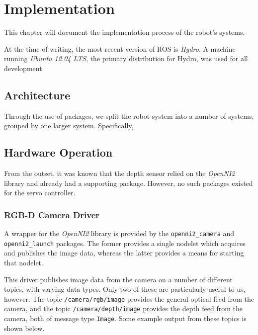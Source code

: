 \chapter{Implementation}


This chapter will document the implementation process of the robot's systems.

At the time of writing, the most recent version of ROS is \emph{Hydro}. A machine running \emph{Ubuntu 12.04 LTS}, the primary distribution for Hydro, was used for all development.


\section{Architecture}

Through the use of packages, we split the robot system into a number of systems, grouped by one larger system. Specifically, 


\section{Hardware Operation}

From the outset, it was known that the depth sensor relied on the \emph{OpenNI2} library and already had a supporting package. However, no such packages existed for the servo controller.

\subsection{RGB-D Camera Driver}

A wrapper for the \emph{OpenNI2} library is provided by the \texttt{openni2\_camera} \cite{ros_wiki_openni2_camera} and \texttt{openni2\_launch} \cite{ros_wiki_openni2_launch} packages. The former provides a single nodelet which acquires and publishes the image data, whereas the latter provides a means for starting that nodelet.

This driver publishes image data from the camera on a number of different topics, with varying data types. Only two of these are particularly useful to us, however. The topic \texttt{/camera/rgb/image} provides the general optical feed from the camera, and the topic \texttt{/camera/depth/image} provides the depth feed from the camera, both of message type \texttt{Image}. Some example output from these topics is shown below.

